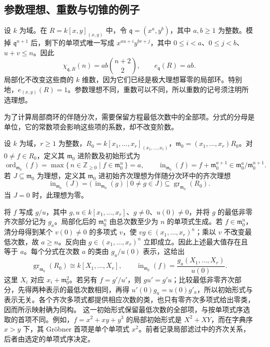 \subsection{参数理想、重数与切锥的例子}
\label{b3:subsec:1104:03}

设 \(k\) 为域。在 \(R=k[x,y]_{(x,y)}\) 中，令 \(\mathfrak q=(x^a,y^b)\)，其中 \(a,b\ge1\) 为整数。模掉 \(\mathfrak q^{n+1}\) 后，剩下的单项式唯一写成 \(x^{au+i}y^{bv+j}\)，其中 \(0\le i<a\)、\(0\le j<b\)、\(u+v\le n\)。因此
\[
	\chi_{\mathfrak q,R}(n)=ab\binom{n+2}{2},\qquad e_{\mathfrak q}(R)=ab.
\]
局部化不改变这些商的 \(k\) 维数，因为它们已经是极大理想幂零的局部环。特别地，\(e_{(x,y)}(R)=1\)。参数理想不同，重数可以不同，所以重数的记号须注明所选理想。

\ProseParagraphBreak
为了计算局部商环的伴随分次，需要保留方程最低次数中的全部项。分式的分母是单位，它的常数项会影响这些项的系数，却不改变阶数。

\begin{definition}\label{b3:def:local-initial-form}
	设 \(k\) 为域，\(r\ge1\) 为整数，\(R_0=k[x_1,\ldots,x_r]_{(x_1,\ldots,x_r)}\)，\(\mathfrak m_0=(x_1,\ldots,x_r)R_0\)。对 \(0\ne f\in R_0\)，定义其 \(\mathfrak m_0\) 进阶数及初始形式为
	\[
		\operatorname{ord}_{\mathfrak m_0}(f) =\max\{\,n\in\mathbb Z_{\ge0}\mid f\in\mathfrak m_0^n\,\}=a, \qquad \operatorname{in}_{\mathfrak m_0}(f) =f+\mathfrak m_0^{a+1}\in\mathfrak m_0^a/\mathfrak m_0^{a+1}.
	\]
	若 \(J\subseteq\mathfrak m_0\) 为理想，定义其 \(\mathfrak m_0\) 进初始齐次理想为伴随分次环中的齐次理想
	\[
		\operatorname{in}_{\mathfrak m_0}(J) =\bigl(\,\operatorname{in}_{\mathfrak m_0}(g)\mid 0\ne g\in J\,\bigr) \subseteq\operatorname{gr}_{\mathfrak m_0}(R_0).
	\]
	当 \(J=0\) 时，此理想为零。
\end{definition}

将 \(f\) 写成 \(g/u\)，其中 \(g,u\in k[x_1,\ldots,x_r]\)、\(g\ne0\)、\(u(0)\ne0\)，并将 \(g\) 的最低非零齐次部分记为 \(g_a\)。局部化后的 \(\mathfrak m_0^n\) 由总次数至少为 \(n\) 的单项式生成。若 \(f\in\mathfrak m_0^n\)，清分母得到某个 \(v(0)\ne0\) 的多项式 \(v\)，使 \(vg\in(x_1,\ldots,x_r)^n\)；乘以 \(v\) 不改变最低次数，故 \(a\ge n\)。反向由 \(g\in(x_1,\ldots,x_r)^n\) 立即成立。因此上述最大值存在且等于 \(a\)。每个分式在次数 \(a\) 的类由 \(g_a/u(0)\) 表示，这给出
\[
	\operatorname{gr}_{\mathfrak m_0}(R_0)\cong k[X_1,\ldots,X_r], \qquad \operatorname{in}_{\mathfrak m_0}(f)=\dfrac{g_a(X_1,\ldots,X_r)}{u(0)}.
\]
这里 \(X_i\) 对应 \(x_i+\mathfrak m_0^2\)。若另有 \(f=g'/u'\)，则 \(gu'=g'u\)；比较最低非零齐次部分，先得两种表示的最低次数相同，再得 \(u'(0)g_a=u(0)g'_a\)，所以初始形式与表示无关。各个齐次多项式都提供相应次数的类，也只有零齐次多项式给出零类，因而所示映射确为同构。 这一初始形式保留最低次数的全部项，与按单项式序选取的首项不同。例如，\(f=x^2+xy+y^3\) 的局部初始形式是 \(X^2+XY\)，而在字典序 \(x>y\) 下，其 Gröbner 首项是单个单项式 \(x^2\)。前者记录局部滤过中的齐次关系，后者由选定的单项式序决定。

